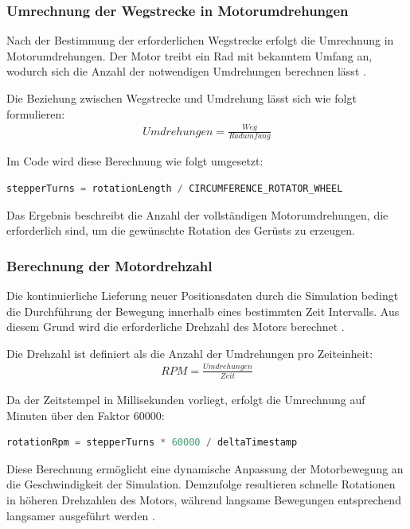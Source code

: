 \subsubsection{Umrechnung der Wegstrecke in Motorumdrehungen}
Nach der Bestimmung der erforderlichen Wegstrecke erfolgt die Umrechnung in Motorumdrehungen. Der Motor treibt ein Rad mit bekanntem Umfang an, wodurch sich die Anzahl der notwendigen Umdrehungen berechnen lässt \cite{Siciliano1959}.

Die Beziehung zwischen Wegstrecke und Umdrehung lässt sich wie folgt formulieren: \cite{Bohme1967}
\begin{align}
        Umdrehungen = \frac{Weg}{Radumfang}
\end{align}

Im Code wird diese Berechnung wie folgt umgesetzt:
\begin{lstlisting}[language=C++, caption={Umrechnung der Wegstrecke in Motorumdrehungen (Rotationsbewegung)}, label={lst:motorsteps_rotation_calculation}]
        stepperTurns = rotationLength / CIRCUMFERENCE_ROTATOR_WHEEL
\end{lstlisting}
Das Ergebnis beschreibt die Anzahl der vollständigen Motorumdrehungen, die erforderlich sind, um die gewünschte Rotation des Gerüsts zu erzeugen.

\subsubsection{Berechnung der Motordrehzahl}\label{sec:calculate-mover-steps}
Die kontinuierliche Lieferung neuer Positionsdaten durch die Simulation bedingt die Durchführung der Bewegung innerhalb eines bestimmten Zeit Intervalls. Aus diesem Grund wird die erforderliche Drehzahl des Motors berechnet \cite{Siciliano1959}.

Die Drehzahl ist definiert als die Anzahl der Umdrehungen pro Zeiteinheit:
\begin{align}
        RPM = \frac{Umdrehungen}{Zeit}
\end{align}

Da der Zeitstempel in Millisekunden vorliegt, erfolgt die Umrechnung auf Minuten über den Faktor 60000:
\begin{lstlisting}[language=C++, caption={Umrechnung von Millisekunden auf Minuten}, label={lst:milliseconds_to_minutes_calculation}]
        rotationRpm = stepperTurns * 60000 / deltaTimestamp
\end{lstlisting}
Diese Berechnung ermöglicht eine dynamische Anpassung der Motorbewegung an die Geschwindigkeit der Simulation. Demzufolge resultieren schnelle Rotationen in höheren Drehzahlen des Motors, während langsame Bewegungen entsprechend langsamer ausgeführt werden \cite{Astrom2021}.

